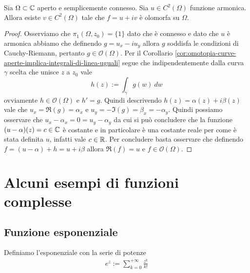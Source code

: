 \begin{theorem}
  Sia $\Omega \subset \mathbb{C}$ aperto e semplicemente connesso. Sia $u \in
  C^2(\Omega)$ funzione armonica. Allora esiste $v \in C^2(\Omega)$ tale che
  $f = u + iv$ è olomorfa su $\Omega$.
  \label{thr:esistenza-armonica-congiunta}
\end{theorem}
\begin{proof}
    Osserviamo che $\pi_1(\Omega, z_0) = \{1\}$ dato che è connesso e dato che
    $u$ è armonica abbiamo che definendo $g = u_x - iu_y$ allora $g$ soddisfa le
    condizioni di Cauchy-Riemann, pertanto $g \in \mathcal{O}(\Omega)$. Per il
    Corollario \ref{cor:omotopia-curve-aperte-implica-integrali-di-linea-uguali}
    segue che indipendentemente dalla curva $\gamma$ scelta che unisce $z$
    a $z_0$ vale
    \begin{equation*}
        h(z) := \int_\gamma g(w)\ dw
    \end{equation*}
    ovviamente $h \in \mathcal{O}(\Omega)$ e $h' = g$.
    Quindi descrivendo $h(z) = \alpha(z) + i\beta(z)$ vale che $u_x = \Re(g)
    = \alpha_x$ e $u_y = -\Im(g) = \beta_x = -\alpha_y$. Quindi possiamo
    osservare che $u_x - \alpha_x = 0 = u_y - \alpha_y$ da cui si può
    concludere che la funzione $(u-\alpha)(z) = c \in \mathbb{C}$ è costante e in 
    particolare è una costante reale per come è stata definita $u$, infatti 
    vale $c \in \mathbb{R}$. Per concludere basta osservare che definendo 
    $f = (u - \alpha) + h = u + i\beta$ allora $\Re(f) = u$ e $f \in
    \mathcal{O}(\Omega)$.
\end{proof}



\chapter{Alcuni esempi di funzioni complesse}

\section{Funzione esponenziale}

\begin{definition}
	\label{defn:funzione-esponenziale}
	Definiamo l'esponenziale con la serie di potenze
	\begin{equation}
	\begin{aligned}
		e^z := \sum^{+\infty}_{k=0} \frac{z^k}{k!}
	\end{aligned}
	\end{equation}
\end{definition}

